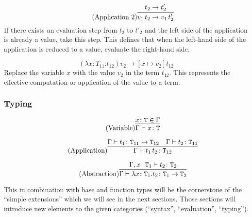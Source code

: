 \begin{equation*}
    \tag{Application 2}
    \infer{
        v_1\,t_2 \rightarrow v_1\,t'_2
    }{
        t_2 \rightarrow t'_2
    }
\end{equation*}
If there exists an evaluation step from $t_2$ to $t'_2$ and the left
side of the application is already a value, take this step. This defines
that when the left-hand side of the application is reduced to a value, evaluate
the right-hand side.

\begin{equation*}
    \tag{Application Abstraction}
    (\lambda x \colon T_{11} . t_{12}) v_2 \rightarrow [x \mapsto v_2] t_{12}
\end{equation*}
Replace the variable $x$ with the value $v_2$ in the term $t_{12}$. This represents
the effective computation or application of the value to a term.

\subsubsection{Typing}
\begin{equation*}
    \tag{Variable}
    \infer{
        \Gamma \vdash x \colon \texttt{T}
    }{
        x \colon \texttt{T} \in \Gamma
    }
\end{equation*}

\begin{equation*}
    \tag{Application}
    \infer{
        \Gamma \vdash t_1\,t_2 \colon \texttt{T}_{12}
    }{
        \Gamma \vdash t_1 \colon \texttt{T}_{11} \rightarrow \texttt{T}_{12}
        &
        \Gamma \vdash t_2 \colon \texttt{T}_{11}
    }
\end{equation*}

\begin{equation*}
    \tag{Abstraction}
    \infer{
        \Gamma \vdash \lambda x \colon \texttt{T}_1 . t_2 \colon \texttt{T}_1 \rightarrow \texttt{T}_2
    }{
        \Gamma,x \colon \texttt{T}_1 \vdash t_2 \colon \texttt{T}_2
    }
\end{equation*}

This in combination with base and function types will be the
cornerstone of the ``simple extensions'' which we will see in the
next sections. Those sections will introduce new elements to the given
categories (``syntax'', ``evaluation'', ``typing'').
